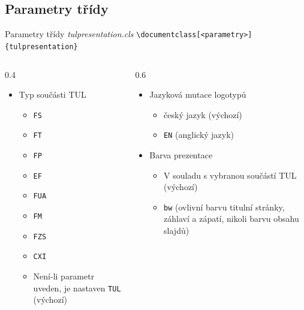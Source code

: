 \documentclass[TUL,aspect169]{tulpresentation} %
\begin{document}
\subsection{Parametry třídy}
\begin{frame}[fragile]{Parametry třídy \emph{tulpresentation.cls}}
\verb|\documentclass[<parametry>]{tulpresentation}| 

  \begin{columns}[T]
      \begin{column}{0.4\textwidth}
        \begin{itemize}
          \item Typ součásti TUL
          \begin{itemize}
            \item \verb|FS|
            \item \verb|FT|
            \item \verb|FP|
            \item \verb|EF|
            \item \verb|FUA|
            \item \verb|FM|
            \item \verb|FZS|
            \item \verb|CXI|
            \item Není-li parametr uveden, je nastaven \verb|TUL| (výchozí)
          \end{itemize}      
        \end{itemize}        
      \end{column}
      \begin{column}{0.6\textwidth}
        \begin{itemize}
          \item Jazyková mutace logotypů
          \begin{itemize}
            \item český jazyk (výchozí)
            \item \verb|EN| (anglický jazyk)
          \end{itemize}
          \item Barva prezentace        
          \begin{itemize}
            \item V souladu s vybranou součástí TUL (výchozí)
            \item \verb|bw| (ovlivní barvu titulní stránky, záhlaví a zápatí, nikoli barvu obsahu slajdů)
          \end{itemize}
        \end{itemize}
      \end{column}
  \end{columns}
\end{frame}
\end{document}
